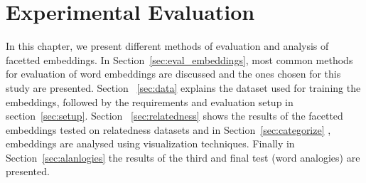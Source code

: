 \chapter{Experimental Evaluation}
\label{chap:eval}
In this chapter, we present different methods of evaluation and analysis of facetted embeddings. In Section~\ref{sec:eval_embeddings}, most common methods for evaluation of word embeddings are discussed and the ones chosen for this study are presented. Section ~\ref{sec:data} explains the dataset used for training the embeddings, followed by the requirements and evaluation setup in section~\ref{sec:setup}. Section ~\ref{sec:relatedness} shows the results of the facetted embeddings tested on relatedness datasets and in Section~\ref{sec:categorize} , embeddings are analysed using visualization techniques. Finally in Section~\ref{sec:alanlogies} the results of the third and final test (word analogies) are presented. 

